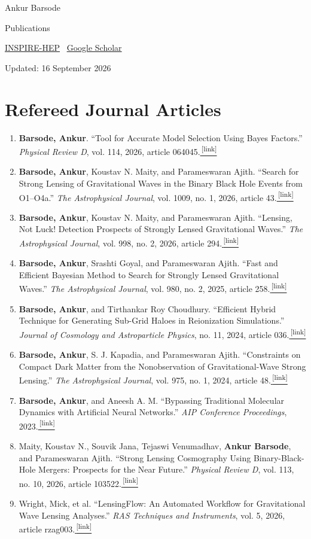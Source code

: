 \documentclass[a4paper,11pt]{article}
\newcommand{\publication}[2]{\item #1\href{#2}{\,\textsuperscript{[link]}}}
\newcommand{\myname}{\textbf{Barsode, Ankur}}
\newcommand{\myfullname}{\textbf{Ankur Barsode}}
\begin{document}
\pagestyle{empty}

{\LARGE Ankur Barsode}\par
\vspace{3pt}
{\large Publications}\par
\vspace{5pt}
\href{https://inspirehep.net/authors/3081663}{INSPIRE-HEP} \textbar\ \href{https://scholar.google.com/citations?user=HiMMiqgAAAAJ\&hl=en}{Google Scholar}\par
\small Updated: 16 September 2026

\section{Refereed Journal Articles}
\begin{enumerate}
\publication{\myname. ``Tool for Accurate Model Selection Using Bayes Factors.'' \textit{Physical Review D}, vol. 114, 2026, article 064045.}{https://doi.org/10.1103/wv11-h53b}
\publication{\myname, Koustav N. Maity, and Parameswaran Ajith. ``Search for Strong Lensing of Gravitational Waves in the Binary Black Hole Events from O1--O4a.'' \textit{The Astrophysical Journal}, vol. 1009, no. 1, 2026, article 43.}{https://doi.org/10.3847/1538-4357/ae9d69}
\publication{\myname, Koustav N. Maity, and Parameswaran Ajith. ``Lensing, Not Luck! Detection Prospects of Strongly Lensed Gravitational Waves.'' \textit{The Astrophysical Journal}, vol. 998, no. 2, 2026, article 294.}{https://doi.org/10.3847/1538-4357/ae38c1}
\publication{\myname, Srashti Goyal, and Parameswaran Ajith. ``Fast and Efficient Bayesian Method to Search for Strongly Lensed Gravitational Waves.'' \textit{The Astrophysical Journal}, vol. 980, no. 2, 2025, article 258.}{https://doi.org/10.3847/1538-4357/adae10}
\publication{\myname, and Tirthankar Roy Choudhury. ``Efficient Hybrid Technique for Generating Sub-Grid Haloes in Reionization Simulations.'' \textit{Journal of Cosmology and Astroparticle Physics}, no. 11, 2024, article 036.}{https://doi.org/10.1088/1475-7516/2024/11/036}
\publication{\myname, S. J. Kapadia, and Parameswaran Ajith. ``Constraints on Compact Dark Matter from the Nonobservation of Gravitational-Wave Strong Lensing.'' \textit{The Astrophysical Journal}, vol. 975, no. 1, 2024, article 48.}{https://doi.org/10.3847/1538-4357/ad77c4}
\publication{\myname, and Aneesh A. M. ``Bypassing Traditional Molecular Dynamics with Artificial Neural Networks.'' \textit{AIP Conference Proceedings}, 2023.}{https://doi.org/10.1063/5.0127801}
\publication{Maity, Koustav N., Souvik Jana, Tejaswi Venumadhav, \myfullname, and Parameswaran Ajith. ``Strong Lensing Cosmography Using Binary-Black-Hole Mergers: Prospects for the Near Future.'' \textit{Physical Review D}, vol. 113, no. 10, 2026, article 103522.}{https://doi.org/10.1103/xq61-pqm6}
\publication{Wright, Mick, et al. ``LensingFlow: An Automated Workflow for Gravitational Wave Lensing Analyses.'' \textit{RAS Techniques and Instruments}, vol. 5, 2026, article rzag003.}{https://doi.org/10.1093/rasti/rzag003}
\end{enumerate}
\end{document}
